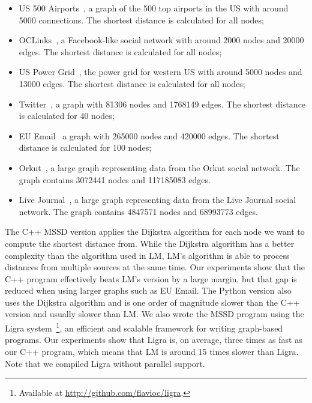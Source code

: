 \begin{itemize}
   \item US 500 Airports~\cite{usairports,tnet}, a graph of the 500 top airports in the US with around
      5000 connections. The shortest distance is calculated for all nodes;
      
   \item OCLinks~\cite{tnet,oclinks}, a Facebook-like social network with around 2000 nodes and 20000 edges. The shortest
      distance is calculated for all nodes;

   \item US Power Grid~\cite{tnet,uspowergrid}, the power grid for western US with around 5000
      nodes and 13000 edges. The shortest distance is calculated for all nodes;

   \item Twitter~\cite{snapnets,NIPS2012_4532}, a graph with 81306 nodes and 1768149 edges.
      The shortest distance is calculated for 40 nodes; 

   \item EU Email~\cite{snapnets,Leskovec:2007:GED:1217299.1217301} a graph with
      265000 nodes and 420000 edges. The shortest distance is calculated for 100
      nodes;

   \item Orkut~\cite{snapnets,Yang:2012:DEN:2350190.2350193}, a large graph
      representing data from the Orkut social network. The graph contains
      3072441 nodes and 117185083 edges.

   \item Live Journal~\cite{snapnets,Backstrom06groupformation}, a large graph representing data from the
      Live Journal social network. The graph contains 4847571 nodes and 68993773
      edges.

\end{itemize}

The C++ MSSD version applies the Dijkstra algorithm for each node we want to
compute the shortest distance from. While the Dijkstra algorithm has a better
complexity than the algorithm used in LM, LM's algorithm is able to process
distances from multiple sources at the same time. Our experiments show that the
C++ program effectively beats LM's version by a large margin, but that gap is
reduced when using larger graphs such as EU Email. The Python version also uses
the Dijkstra algorithm and is one order of magnitude slower than the C++ version
and usually slower than LM. We also wrote the MSSD program using the Ligra
system~\cite{Shun:2013:LLG:2517327.2442530}\footnote{Available at
   \url{http://github.com/flavioc/ligra}.}, an efficient and scalable framework
   for writing graph-based programs. Our experiments show that Ligra is, on
   average, three times as fast as our C++ program, which means that LM is
   around 15 times slower than Ligra. Note that we compiled Ligra without
   parallel support.

